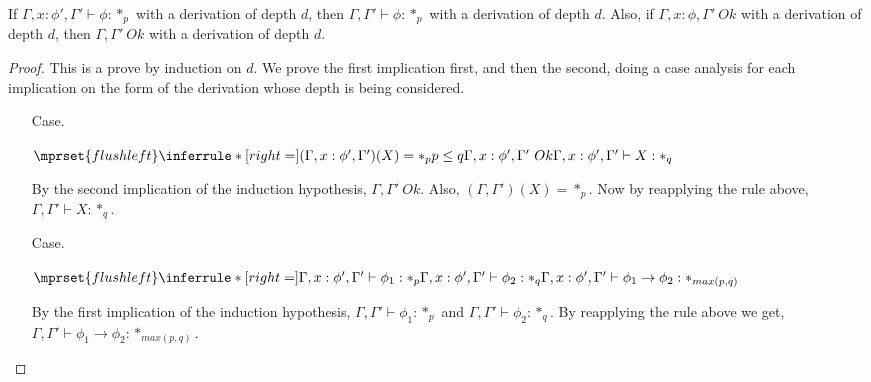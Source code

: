 \begin{lemma}
  If $\Gamma,x:\phi',\Gamma' \vdash \phi:*_p$ with a derivation of depth $d$, then 
  $\Gamma,\Gamma' \vdash \phi:*_p$ with a derivation of depth $d$.  Also, if 
  $\Gamma,x:\phi,\Gamma'\ Ok$ with a 
  derivation of depth $d$, then $\Gamma,\Gamma'\ Ok$ with a derivation of depth $d$.
  \label{lemma:context_strengthening_for_kinding_ssf}
\end{lemma}
\begin{proof}
  This is a prove by induction on $d$.  We prove the first implication first, and then the 
  second, doing a case analysis for each implication on the form of the derivation whose depth 
  is being considered.

  \begin{itemize}
  \item[Case.]\ \\
    \begin{center}
      \begin{math}
        $$\mprset{flushleft}
        \inferrule* [right=] {
          (\Gamma,x:\phi',\Gamma')(X) = *_p
          \\
          p \leq q
          \\
          \Gamma,x:\phi',\Gamma'\ Ok
        }{\Gamma,x:\phi',\Gamma' \vdash X : *_q}
      \end{math}
    \end{center}
    
    By the second implication of the induction hypothesis, $\Gamma,\Gamma'\ Ok$. Also, 
    $(\Gamma,\Gamma')(X) = *_p$.  Now by reapplying the rule above, 
    $\Gamma,\Gamma' \vdash X:*_q$.
    
  \item[Case.]\ \\
    \begin{center}
      \begin{math}
        $$\mprset{flushleft}
        \inferrule* [right=] {
          \Gamma,x:\phi',\Gamma' \vdash \phi_1 : *_p
          \\
          \Gamma,x:\phi',\Gamma' \vdash \phi_2 : *_q
        }{\Gamma,x:\phi',\Gamma' \vdash \phi_1 \rightarrow \phi_2 : *_{max(p,q)}}
      \end{math}
    \end{center}
    
    By the first implication of the induction hypothesis, $\Gamma,\Gamma' \vdash \phi_1:*_p$ and 
    $\Gamma,\Gamma' \vdash \phi_2:*_q$.  By reapplying the rule above we get, 
    $\Gamma,\Gamma' \vdash \phi_1 \rightarrow \phi_2:*_{max(p,q)}$.
    

\end{itemize}
\end{proof}
